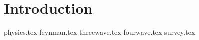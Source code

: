 \chapter{Introduction}

{physics.tex}
{feynman.tex}
{threewave.tex}
{fourwave.tex}
{survey.tex}





